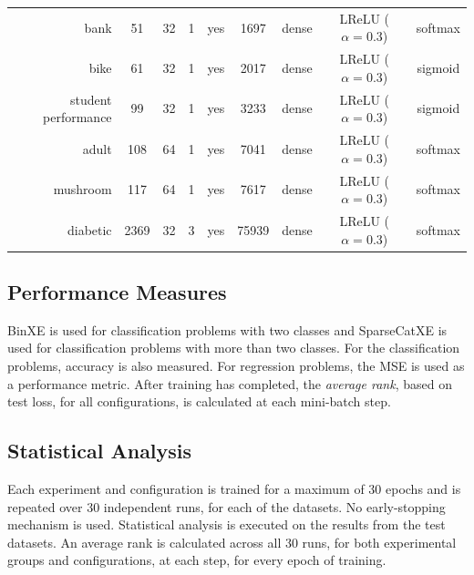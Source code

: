 \documentclass[preprint,review,12pt]{elsarticle}
\begin{document}
\begin{table}[!tb]
{\begin{tabular}{rcccccccc}
			bank                & 51              & 32              & 1               & yes             & 1697                & dense             & LReLU ($\alpha = 0.3$) & softmax                \\
			bike                & 61              & 32              & 1               & yes             & 2017                & dense             & LReLU ($\alpha = 0.3$) & sigmoid                \\
			student performance & 99              & 32              & 1               & yes             & 3233                & dense             & LReLU ($\alpha = 0.3$) & sigmoid                \\
			adult               & 108             & 64              & 1               & yes             & 7041                & dense             & LReLU ($\alpha = 0.3$) & softmax                \\
			mushroom            & 117             & 64              & 1               & yes             & 7617                & dense             & LReLU ($\alpha = 0.3$) & softmax                \\
			diabetic            & 2369            & 32              & 3               & yes             & 75939               & dense             & LReLU ($\alpha = 0.3$) & softmax                \\
		\end{tabular}%
	}
\end{table}%


\subsection{Performance Measures}\label{sec:methodology:performance_measures}

\Acf{BinXE} is used for classification problems with two classes and \acf{SparseCatXE} is used for classification problems with more than two classes. For the classification problems, accuracy is also measured. For regression problems, the \acf{MSE} is used as a performance metric. After training has completed, the \textit{average rank}, based on test loss, for all configurations, is calculated at each mini-batch step.


\subsection{Statistical Analysis}
\label{sec:methodology:statistical_analysis}

Each experiment and configuration is trained for a maximum of 30 epochs and is repeated over 30 independent runs, for each of the datasets. No early-stopping mechanism is used. Statistical analysis is executed on the results from the test datasets. An average rank is calculated across all 30 runs, for both experimental groups and configurations, at each step, for every epoch of training.
\end{document}
